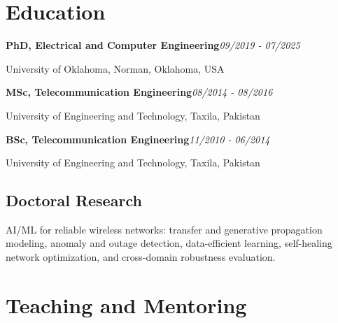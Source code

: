 \documentclass[9pt,letterpaper]{extarticle}
\newcommand{\entry}[2]{\Needspace{4\baselineskip}\textbf{#1}\hfill\textit{#2}\par}
\begin{document}
\section{Education}
\entry{PhD, Electrical and Computer Engineering}{09/2019 - 07/2025}
University of Oklahoma, Norman, Oklahoma, USA\par
\entry{MSc, Telecommunication Engineering}{08/2014 - 08/2016}
University of Engineering and Technology, Taxila, Pakistan\par
\entry{BSc, Telecommunication Engineering}{11/2010 - 06/2014}
University of Engineering and Technology, Taxila, Pakistan\par
{}
\subsection{Doctoral Research}
AI/ML for reliable wireless networks: transfer and generative propagation modeling, anomaly and outage detection, data-efficient learning, self-healing network optimization, and cross-domain robustness evaluation.\par
{}
\section{Teaching and Mentoring}
\end{document}
